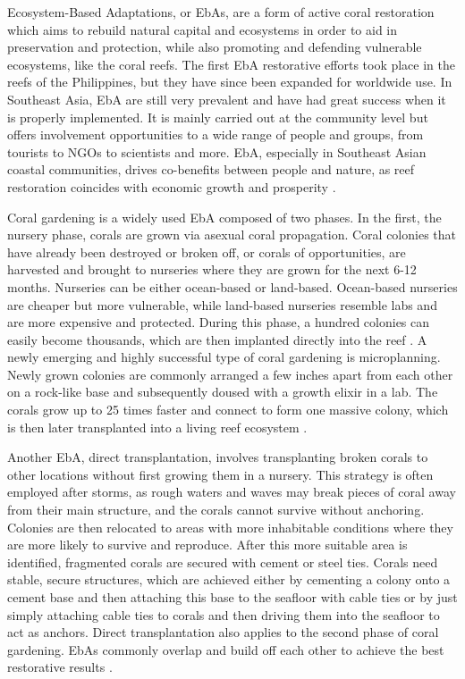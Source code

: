 \documentclass{book}\usepackage{knitr}
\begin{document}
Ecosystem-Based Adaptations, or EbAs, are a form of active coral restoration which aims to rebuild natural capital and ecosystems in order to aid in preservation and protection, while also promoting and defending vulnerable ecosystems, like the coral reefs. The first EbA restorative efforts took place in the reefs of the Philippines, but they have since been expanded for worldwide use. In Southeast Asia, EbA are still very prevalent and have had great success when it is properly implemented. It is mainly carried out at the community level but offers involvement opportunities to a wide range of people and groups, from tourists to NGOs to scientists and more. EbA, especially in Southeast Asian coastal communities, drives co-benefits between people and nature, as reef restoration coincides with economic growth and prosperity \citep{14551496520201201}.

Coral gardening is a widely used EbA composed of two phases. In the first, the nursery phase, corals are grown via asexual coral propagation. Coral colonies that have already been destroyed or broken off, or corals of opportunities, are harvested and brought to nurseries where they are grown for the next 6-12 months. Nurseries can be either ocean-based or land-based. Ocean-based nurseries are cheaper but more vulnerable, while land-based nurseries resemble labs and are more expensive and protected.  During this phase, a hundred colonies can easily become thousands, which are then implanted directly into the reef \citep{cgarden}. A newly emerging and highly successful type of coral gardening is microplanning. Newly grown colonies are commonly arranged a few inches apart from each other on a rock-like base and subsequently doused with a growth elixir in a lab. The corals grow up to 25 times faster and connect to form one massive colony, which is then later transplanted into a living reef ecosystem \citep{Morin_2014}.

Another EbA, direct transplantation, involves transplanting broken corals to other locations without first growing them in a nursery. This strategy is often employed after storms, as rough waters and waves may break pieces of coral away from their main structure, and the corals cannot survive without anchoring. Colonies are then relocated to areas with more inhabitable conditions where they are more likely to survive and reproduce. After this more suitable area is identified, fragmented corals are secured with cement or steel ties. Corals need stable, secure structures, which are achieved either by cementing a colony onto a cement base and then attaching this base to the seafloor with cable ties or by just simply attaching cable ties to corals and then driving them into the seafloor to act as anchors. Direct transplantation also applies to the second phase of coral gardening. EbAs commonly overlap and build off each other to achieve the best restorative results \citep{areef}.
\end{document}
